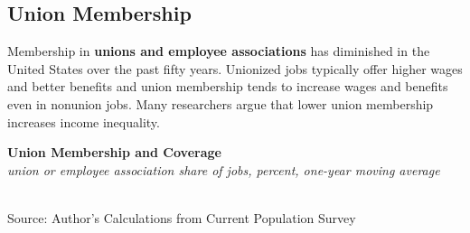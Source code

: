 \documentclass{report}
\makeatletter
\newcommand{\tbllink}[1]{\href{https://raw.githubusercontent.com/bdecon/US-chartbook/master/chartbook/data/#1}{\faTable}}
\newcommand*\short[1]{\expandafter\@gobbletwo\number\numexpr#1\relax}
\newcommand{\ctsbar}[5]{
		\addplot[ybar stacked, bar width=#5, draw opacity=0, fill=#1] 
			table [x=#2, y=#3, col sep=comma]{#4};}
\newcommand{\dateaxisticks}{
		date coordinates in=x, axis line style={draw=none},
		xmax={2023-10-01},
		max space between ticks=40,	    
		xtick={{1990-01-01}, {1992-01-01}, {1994-01-01}, 
			{1996-01-01}, {1998-01-01}, {2000-01-01}, 
			{2002-01-01}, {2004-01-01}, {2006-01-01},
			{2008-01-01}, {2010-01-01}, {2012-01-01}, {2014-01-01},
		    {2016-01-01}, {2018-01-01}, {2020-01-01}, {2022-01-01}, 
		    {2024-01-01}, {2026-01-01}},
		minor xtick={{1989-01-01}, {1991-01-01}, {1993-01-01},
			{1995-01-01}, {1997-01-01}, {1999-01-01}, 
			{2001-01-01}, {2003-01-01}, {2005-01-01}, {2007-01-01},
		    {2009-01-01}, {2011-01-01}, {2013-01-01}, {2015-01-01},
		    {2017-01-01}, {2019-01-01}, {2021-01-01}, {2023-01-01}, 
		    {2025-01-01}, {2027-01-01}},
		enlarge y limits={0.06}, enlarge x limits={0.01},
		}
\newcommand{\bbar}[2]{extra #1 ticks = {{#2}}, extra #1 tick labels = ,
		extra #1 tick style = {grid=major, grid style={thick, black!25}},}
\newcommand{\rbars}{
		\fill[color=black!10] (axis cs:{1990-07-01},\pgfkeysvalueof{/pgfplots/ymin}) rectangle 
			(axis cs:{1991-03-01}, \pgfkeysvalueof{/pgfplots/ymax});
		\fill[color=black!10] (axis cs:{2007-12-01},\pgfkeysvalueof{/pgfplots/ymin}) rectangle 
			(axis cs:{2009-07-01}, \pgfkeysvalueof{/pgfplots/ymax});
		\fill[color=black!10] (axis cs:{2001-03-01},\pgfkeysvalueof{/pgfplots/ymin}) rectangle 
			(axis cs:{2001-11-01}, \pgfkeysvalueof{/pgfplots/ymax});
		\fill[color=black!10] (axis cs:{2020-02-01},\pgfkeysvalueof{/pgfplots/ymin}) rectangle 
			(axis cs:{2020-05-01}, \pgfkeysvalueof{/pgfplots/ymax});}
\makeatother
\begin{document}
{\begin{minipage}{0.76\textwidth}
\subsection*{Union Membership}
\hypertarget{labun}{\label{labun}}
\small Membership in \textbf{unions and employee associations} has diminished in the United States over the past fifty years. Unionized jobs typically offer higher wages and better benefits and union membership tends to increase wages and benefits even in nonunion jobs. Many researchers argue that lower union membership increases income inequality. 


\vspace{1mm}

\normalsize \textbf{Union Membership and Coverage}\\
\footnotesize{\textit{union or employee association share of jobs, percent, one-year moving average}}\\
\hspace*{-2mm} \\
\footnotesize{Source: Author's Calculations from Current Population Survey} \hfill \tbllink{union.csv}
\end{minipage}
\vspace{3mm}

}
\end{document}
